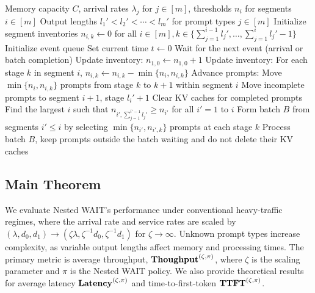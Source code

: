\begin{algorithm}[h]
\caption{Nested WAIT: Nested Waiting for Accumulated Inference Threshold}
\label{alg:nested_wait}
{\small\linespread{1.0}\selectfont
\begin{algorithmic}[1]
\Require Memory capacity \( C \), arrival rates \( \lambda_j \) for \( j \in [m] \), thresholds \( n_i \) for segments \( i \in [m] \)
\Require Output lengths \( l_1' < l_2' < \cdots < l_m' \) for prompt types \( j \in [m] \)
\State Initialize segment inventories \( n_{i,k} \gets 0 \) for all \( i \in [m], k \in \{\sum_{j=1}^{i-1} l_j', \dots, \sum_{j=1}^{i} l_j' - 1\} \)
\State Initialize event queue
\State Set current time \( t \gets 0 \)
    \State Wait for the next event (arrival or batch completion)
        \State Update inventory: \( n_{1,0} \gets n_{1,0} + 1 \)  
        \State Update inventory: For each stage \( k \) in segment \( i \), \( n_{i,k} \gets n_{i,k} - \min\{n_i, n_{i,k}\} \)
        \State Advance prompts: Move \( \min\{n_i, n_{i,k}\} \) prompts from stage \( k \) to \( k+1 \) within segment \( i \)
                \State Move incomplete prompts to segment \( i+1 \), stage \( l_i' + 1 \) 
            \Else
                \State Clear KV caches for completed prompts
            \EndIf
        \EndIf
    \EndIf
    \State Find the largest \( i \) such that \( n_{i', \sum_{j=1}^{i'-1} l_j'} \geq n_{i'} \) for all \( i' = 1 \) to \( i \)
        \State Form batch \( B \) from segments \( i' \leq i \) by selecting \( \min\{n_{i'}, n_{i',k}\} \) prompts at each stage \( k \)
        \State Process batch \( B \), keep prompts outside the batch waiting and do not delete their KV caches
    \EndIf
\EndWhile
\end{algorithmic}
}
\end{algorithm}

\subsection{Main Theorem}
\label{subsec:nested_main_theorem}

We evaluate Nested WAIT’s performance under conventional heavy-traffic regimes, where the arrival rate and service rates are scaled by $(\lambda,d_0,d_1)\to(\zeta\lambda,\zeta^{-1}d_0,\zeta^{-1}d_1)$ for $\zeta\to\infty$. Unknown prompt types increase complexity, as variable output lengths affect memory and processing times. The primary metric is average throughput, \( \textbf{Thoughput}^{(\zeta, \pi)} \), where \( \zeta \) is the scaling parameter and \( \pi \) is the Nested WAIT policy. We also provide theoretical results for average latency \( \textbf{Latency}^{(\zeta, \pi)} \) and time-to-first-token \( \textbf{TTFT}^{(\zeta, \pi)} \).

